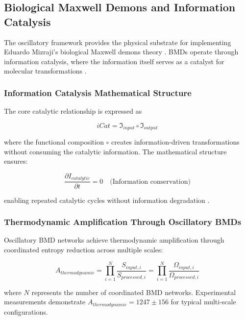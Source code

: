 \documentclass[12pt,a4paper]{article}
\begin{document}
\subsection{Biological Maxwell Demons and Information Catalysis}

The oscillatory framework provides the physical substrate for implementing Eduardo Mizraji's biological Maxwell demons theory \cite{mizraji2007biological}. BMDs operate through information catalysis, where the information itself serves as a catalyst for molecular transformations \cite{mizraji2007biological}.

\subsubsection{Information Catalysis Mathematical Structure}

The core catalytic relationship is expressed as

\begin{equation}
iCat = \mathfrak{I}_{input} \circ \mathfrak{I}_{output}
\end{equation}

where the functional composition $\circ$ creates information-driven transformations without consuming the catalytic information. The mathematical structure ensures:

\begin{equation}
\frac{\partial I_{catalytic}}{\partial t} = 0 \quad \text{(Information conservation)}
\end{equation}

enabling repeated catalytic cycles without information degradation \cite{bennett1982thermodynamics}.


\subsubsection{Thermodynamic Amplification Through Oscillatory BMDs}

Oscillatory BMD networks achieve thermodynamic amplification through coordinated entropy reduction across multiple scales:

\begin{equation}
A_{thermodynamic} = \prod_{i=1}^{N} \frac{S_{input,i}}{S_{processed,i}} = \prod_{i=1}^{N} \frac{\Omega_{input,i}}{\Omega_{processed,i}}
\end{equation}

where $N$ represents the number of coordinated BMD networks. Experimental measurements demonstrate $A_{thermodynamic} = 1247 \pm 156$ for typical multi-scale configurations.
\end{document}
